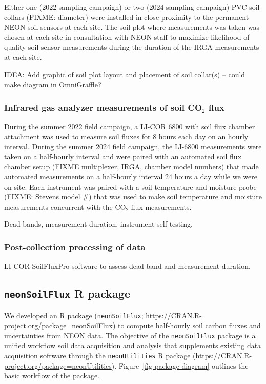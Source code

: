 \documentclass[
  letterpaper,
  DIV=11,
  numbers=noendperiod]{scrartcl}
\begin{document}
Either one (2022 sampling campaign) or two (2024 sampling campaign) PVC
soil collars (FIXME: diameter) were installed in close proximity to the
permanent NEON soil sensors at each site. The soil plot where
measurements was taken was chosen at each site in consultation with NEON
staff to maximize likelihood of quality soil sensor measurements during
the duration of the IRGA measurements at each site.

IDEA: Add graphic of soil plot layout and placement of soil collar(s) --
could make diagram in OmniGraffle?

\subsubsection{\texorpdfstring{Infrared gas analyzer measurements of
soil CO\(_{2}\)
flux}{Infrared gas analyzer measurements of soil CO\_\{2\} flux}}\label{infrared-gas-analyzer-measurements-of-soil-co_2-flux}

During the summer 2022 field campaign, a LI-COR 6800 with soil flux
chamber attachment was used to measure soil fluxes for 8 hours each day
on an hourly interval. During the summer 2024 field campaign, the
LI-6800 measurements were taken on a half-hourly interval and were
paired with an automated soil flux chamber setup (FIXME multiplexer,
IRGA, chamber model numbers) that made automated measurements on a
half-hourly interval 24 hours a day while we were on site. Each
instrument was paired with a soil temperature and moisture probe (FIXME:
Stevens model \#) that was used to make soil temperature and moisture
measurements concurrent with the CO\(_{2}\) flux measurements.

Dead bands, measurement duration, instrument self-testing.

\subsubsection{Post-collection processing of
data}\label{post-collection-processing-of-data}

LI-COR SoilFluxPro software to assess dead band and measurement
duration.

\subsection{\texorpdfstring{\texttt{neonSoilFlux} R
package}{neonSoilFlux R package}}\label{neonsoilflux-r-package}

We developed an R package (\texttt{neonSoilFlux};
https://CRAN.R-project.org/package=neonSoilFlux) to compute half-hourly
soil carbon fluxes and uncertainties from NEON data. The objective of
the \texttt{neonSoilFlux} package is a unified workflow soil data
acquisition and analysis that supplements existing data acquisition
software through the \texttt{neonUtilities} R package
(\url{https://CRAN.R-project.org/package=neonUtilities}).
Figure~\ref{fig-package-diagram} outlines the basic workflow of the
package.
\end{document}
